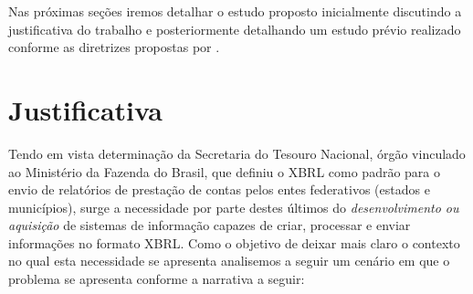 \documentclass{article}
\begin{document}
Nas próximas seções iremos detalhar o estudo proposto
inicialmente discutindo a justificativa do trabalho  e posteriormente
detalhando um estudo prévio realizado conforme as diretrizes propostas
por \cite{kitchenham2009systematic}. 
\section{Justificativa}
\label{sec:contexto}

Tendo em vista determinação da Secretaria do Tesouro Nacional, órgão
vinculado ao  Ministério da Fazenda do Brasil, que definiu o XBRL como
padrão para o envio de relatórios de prestação de contas pelos entes
federativos (estados e municípios), surge a necessidade por parte
destes últimos do \textit{desenvolvimento ou aquisição} de sistemas de
informação capazes de criar, processar e enviar informações no formato
XBRL. Como o objetivo de deixar mais claro o contexto no qual esta
necessidade se apresenta analisemos a seguir um cenário em que o
problema se apresenta conforme a narrativa a seguir:
\\
\\
\end{document}
